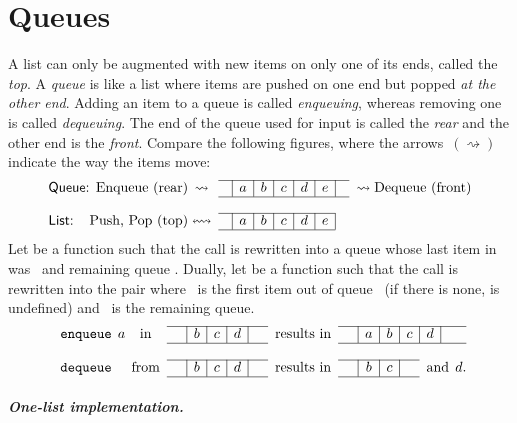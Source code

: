 
\chapter{Queues}

A list can only be augmented with new items on only one of its ends,
called the \emph{top}. A \emph{queue} is like a list where items are
pushed on one end but popped \emph{at the other end}. Adding an item
to a queue is called \emph{enqueuing}, whereas removing one is called
\emph{dequeuing}. The end of the queue used for input is called the
\emph{rear} and the other end is the \emph{front}. Compare the
following figures, where the arrows~\((\rightsquigarrow)\) indicate
the way the items move:
\[
\begin{array}{@{}l@{}r@{\;}cc|c|c|c|c|c|cc@{\;}l@{}}
\cline{4-10}
\textsf{Queue:} & \text{Enqueue (rear)} 
                & \rightsquigarrow & & a & b & c & d & e &
& \rightsquigarrow & \text{Dequeue (front)}\\
\cline{4-10}\\
\cline{4-9}
\textsf{List:} & \text{Push, Pop (top)} 
               & \leftrightsquigarrow & & a & b & c & d & e &&&\\
\cline{4-9}
\end{array}
\]
\noindent Let  be a function such that the call
 is rewritten into a queue whose last item in
was~ and remaining queue . Dually, let
 be a function such that the call
 is rewritten into the pair 
where ~is the first item out of queue~ (if there
is none,  is undefined) and ~is the
remaining queue.
\[
\begin{array}{c@{\;\,}c@{\,\;}cc|c|c|c|ccc|c|c|c|c|cc@{}}
\cline{4-8}
\cline{10-15}
\erlcode{enqueue} & a & \text{in} & \phantom{c} & b & c & d &
\phantom{c} 
& \text{results in} & \phantom{c} & a & b & c & d & \phantom{c}\\
\cline{4-8}
\cline{10-15}\\
\cline{4-8}
\cline{10-13}
\erlcode{dequeue} &   & \text{from} & & b & c & d & 
& \text{results in} & & b & c & \multicolumn{1}{c}{} &
\multicolumn{2}{c@{}}{\text{and} \,\; d.}\\
\cline{4-8}
\cline{10-13}
\end{array}
\]

\medskip

\paragraph{One\hyp{}list implementation.}

